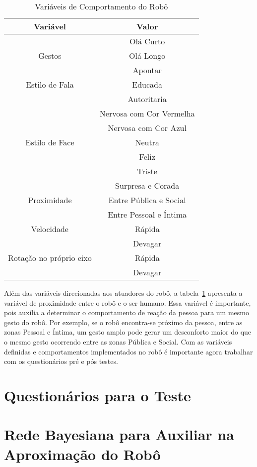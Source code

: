 \begin{table}[!ht]
	\caption{Variáveis de Comportamento do Robô}
	\label{tab:variaveisvalores}
	\centering
	\begin{tabular}{c | c}
		\hline
		Variável & Valor \\
		\hline
		& Olá Curto \\
		Gestos & Olá Longo \\
		& Apontar \\
		\hline
		Estilo de Fala & Educada \\
		& Autoritaria \\
		\hline
		& Nervosa com Cor Vermelha \\
		& Nervosa com Cor Azul \\
		Estilo de Face & Neutra \\
		& Feliz \\
		& Triste \\
		& Surpresa e Corada \\
		\hline
		Proximidade & Entre Pública e Social \\
		& Entre Pessoal e Íntima \\
		\hline
		Velocidade & Rápida \\
		& Devagar \\
		\hline
		Rotação no próprio eixo & Rápida \\
		& Devagar \\
		\hline
	\end{tabular}
\end{table}

Além das variáveis direcionadas aos atuadores do robô, a tabela~\ref{tab:variaveisvalores} apresenta a variável de proximidade entre o robô e o ser humano. Essa variável é importante, pois auxilia a determinar o comportamento de reação da pessoa para um mesmo gesto do robô. Por exemplo, se o robô encontra-se próximo da pessoa, entre as zonas Pessoal e Íntima, um gesto amplo pode gerar um desconforto maior do que o mesmo gesto ocorrendo entre as zonas Pública e Social. Com as variáveis definidas e comportamentos implementados no robô é importante agora trabalhar com os questionários pré e pós testes.

\section{Questionários para o Teste}
\label{sec:questionarios}

\section{Rede Bayesiana para Auxiliar na Aproximação do Robô}
\label{sec:rede-bayesiana}

